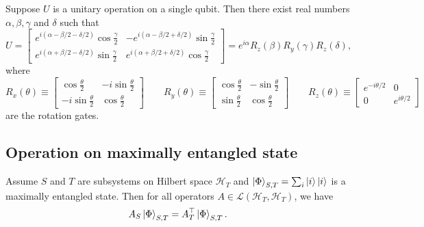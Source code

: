 \documentclass[manuscript, review, timestamp]{acmart}
\begin{document}
\begin{example} \pass
  Suppose $U$ is a unitary operation on a single qubit. Then there exist real numbers $\alpha, \beta, \gamma$ and $\delta$ such that $$
  U = \left[
  \begin{array}{cc}
  e^{i(\alpha - \beta/2 - \delta/2)} \cos \frac{\gamma}{2} & -e^{i(\alpha - \beta/2 + \delta/2)} \sin \frac{\gamma}{2} \\
  e^{i(\alpha + \beta/2 - \delta/2)} \sin \frac{\gamma}{2} & e^{i(\alpha + \beta/2 + \delta/2)} \cos \frac{\gamma}{2}
  \end{array}
  \right]
  = e^{i\alpha}R_z(\beta)R_y(\gamma)R_z(\delta),
  $$
  where
\[
  R_x(\theta) \equiv
  \begin{bmatrix}
  \cos \frac{\theta}{2} & -i \sin \frac{\theta}{2} \\
  -i \sin \frac{\theta}{2} & \cos \frac{\theta}{2}
  \end{bmatrix}
  \qquad
  R_y(\theta) \equiv
  \begin{bmatrix}
  \cos \frac{\theta}{2} & -\sin \frac{\theta}{2} \\
  \sin \frac{\theta}{2} & \cos \frac{\theta}{2}
  \end{bmatrix}
  \qquad
  R_z(\theta) \equiv
  \begin{bmatrix}
  e^{-i \theta / 2} & 0 \\
  0 & e^{i \theta / 2}
  \end{bmatrix}
  \]
  are the rotation gates.
\end{example}


\subsection{Operation on maximally entangled state}
\begin{example} \pass
  Assume $S$ and $T$ are subsystems on Hilbert space $\mathcal{H}_T$ and $\ket{\Phi}_{S,T} = \sum_i \ket{i}\ket{i}$ is a maximally entangled state. Then for all operators $A\in\mathcal{L}(\mathcal{H}_T, \mathcal{H}_T)$, we have 
  $$
  A_S\ket{\Phi}_{S, T} = A_T^\top\ket{\Phi}_{S, T}.
  $$
\end{example}
\end{document}
